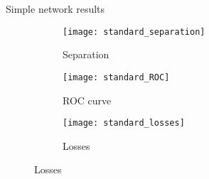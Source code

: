 \begin{frame}{Simple network results}
\vspace{-2mm}
\begin{figure}[htbp]
    \centering
    \begin{subfigure}[b]{0.4\textwidth}
        \texttt{[image: standard\_separation]}
        \caption{Separation}
        \label{fig:simple:final:sepa}
    \end{subfigure}
\quad

    \begin{subfigure}[b]{0.4\textwidth}
		\texttt{[image: standard\_ROC]}
		\caption{ROC curve}
		\label{fig:simple:final:roc}
	\end{subfigure}
\quad
	\begin{subfigure}[b]{0.4\textwidth}
		\texttt{[image: standard\_losses]}
		\caption{Losses}
		\label{fig:simple:final:loss}
	\end{subfigure}
\end{figure}
\end{frame}